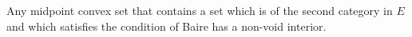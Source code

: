 Any midpoint convex set that contains a set which is of the second category in $E$ and which satisfies the condition of Baire has a non-void interior.
